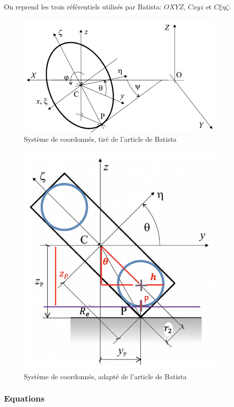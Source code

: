 On reprend les trois référentiels utilisés par Batista: $OXYZ$, $C{xyz}$ et $C{\xi\eta\zeta}$:

\begin{figure}[htb]
\centering
\includegraphics[width=4in]{batista/ref1.png}
\caption{Système de coordonnés, tiré de l'article de Batista \cite{Batista}}
\label{fig:ref1}
\end{figure}

\begin{figure}[htb]
\centering
\includegraphics[width=4in]{batista/ref2.png}
\caption{Système de coordonnés, adapté de l'article de Batista \cite{Batista}}
\label{fig:ref2}
\end{figure}

\subsubsection{Equations}

